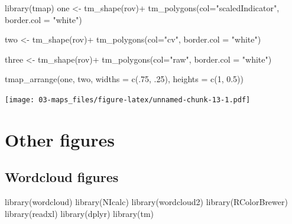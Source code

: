 \documentclass[
]{book}
\newenvironment{Shaded}{\begin{snugshade}}{\end{snugshade}}
\newcommand{\AttributeTok}[1]{\textcolor[rgb]{0.77,0.63,0.00}{#1}}
\newcommand{\DecValTok}[1]{\textcolor[rgb]{0.00,0.00,0.81}{#1}}
\newcommand{\FloatTok}[1]{\textcolor[rgb]{0.00,0.00,0.81}{#1}}
\newcommand{\FunctionTok}[1]{\textcolor[rgb]{0.00,0.00,0.00}{#1}}
\newcommand{\NormalTok}[1]{#1}
\newcommand{\OtherTok}[1]{\textcolor[rgb]{0.56,0.35,0.01}{#1}}
\newcommand{\SpecialCharTok}[1]{\textcolor[rgb]{0.00,0.00,0.00}{#1}}
\newcommand{\StringTok}[1]{\textcolor[rgb]{0.31,0.60,0.02}{#1}}
\begin{document}
\begin{Shaded}
\begin{Highlighting}[]
\FunctionTok{library}\NormalTok{(tmap)}
\NormalTok{one }\OtherTok{\textless{}{-}} \FunctionTok{tm\_shape}\NormalTok{(rov)}\SpecialCharTok{+}
  \FunctionTok{tm\_polygons}\NormalTok{(}\AttributeTok{col=}\StringTok{"scaledIndicator"}\NormalTok{, }
              \AttributeTok{border.col =} \StringTok{"white"}\NormalTok{)}

\NormalTok{two }\OtherTok{\textless{}{-}} \FunctionTok{tm\_shape}\NormalTok{(rov)}\SpecialCharTok{+}
  \FunctionTok{tm\_polygons}\NormalTok{(}\AttributeTok{col=}\StringTok{"cv"}\NormalTok{, }
              \AttributeTok{border.col =} \StringTok{"white"}\NormalTok{)}

\NormalTok{three }\OtherTok{\textless{}{-}} \FunctionTok{tm\_shape}\NormalTok{(rov)}\SpecialCharTok{+}
  \FunctionTok{tm\_polygons}\NormalTok{(}\AttributeTok{col=}\StringTok{"raw"}\NormalTok{, }
              \AttributeTok{border.col =} \StringTok{"white"}\NormalTok{)}


\FunctionTok{tmap\_arrange}\NormalTok{(one, two, }
             \AttributeTok{widths =} \FunctionTok{c}\NormalTok{(.}\DecValTok{75}\NormalTok{, .}\DecValTok{25}\NormalTok{),}
             \AttributeTok{heights =} \FunctionTok{c}\NormalTok{(}\DecValTok{1}\NormalTok{, }\FloatTok{0.5}\NormalTok{))}
\end{Highlighting}
\end{Shaded}

\texttt{[image: 03-maps\_files/figure-latex/unnamed-chunk-13-1.pdf]}

\hypertarget{other-figures}{%
\chapter{Other figures}\label{other-figures}}

\hypertarget{wordcloud-figures}{%
\section{Wordcloud figures}\label{wordcloud-figures}}

\begin{Shaded}
\begin{Highlighting}[]

\FunctionTok{library}\NormalTok{(wordcloud)}
\FunctionTok{library}\NormalTok{(NIcalc)}
\FunctionTok{library}\NormalTok{(wordcloud2)}
\FunctionTok{library}\NormalTok{(RColorBrewer)}
\FunctionTok{library}\NormalTok{(readxl)}
\FunctionTok{library}\NormalTok{(dplyr)}
\FunctionTok{library}\NormalTok{(tm)}
\end{Highlighting}
\end{Shaded}
\end{document}
